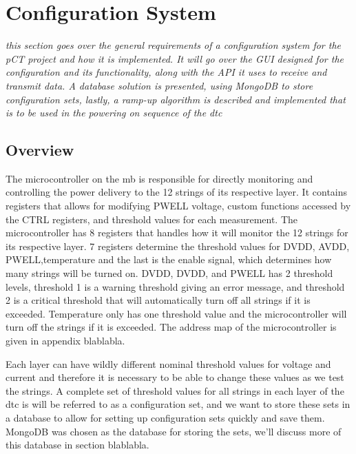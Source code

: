 \documentclass[main.tex]{subfiles}
\begin{document}
\section{Configuration System}
\label{section: configuration}
\textit{this section goes over the general requirements of a configuration system for the pCT project and how it is implemented. It will go over the GUI designed for the configuration and its functionality, along with the API it uses to receive and transmit data. A database solution is presented, using MongoDB to store configuration sets, lastly, a ramp-up algorithm is described and implemented that is to be used in the powering on sequence of the \gls{dtc} }





\subsection{Overview}
The microcontroller on the \gls{mb} is responsible for directly monitoring and controlling the power delivery to the 12 strings of its respective layer. It contains registers that allows for modifying PWELL voltage, custom functions accessed by the CTRL registers, and threshold values for each measurement. The microcontroller has 8 registers that handles how it will monitor the 12 strings for its respective layer.  7 registers determine the threshold values for DVDD, AVDD, PWELL,temperature and the last is the enable signal, which determines how many strings will be turned on. DVDD, DVDD, and PWELL has 2 threshold levels, threshold 1 is a warning threshold giving an error message, and threshold 2 is a critical threshold that will automatically turn off all strings if it is exceeded. Temperature only has one threshold value and the microcontroller will turn off the strings if it is exceeded. The address map of the microcontroller is given in appendix blablabla.

Each layer can have wildly different nominal threshold values for voltage and current and therefore it is necessary to be able to change these values as we test the strings. A complete set of threshold values for all strings in each layer of the \gls{dtc} is will be referred to as a configuration set, and we want to store these sets in a database to allow for setting up configuration sets quickly and save them. MongoDB was chosen as the database for storing the sets, we'll discuss more of this database in section blablabla.
\end{document}
